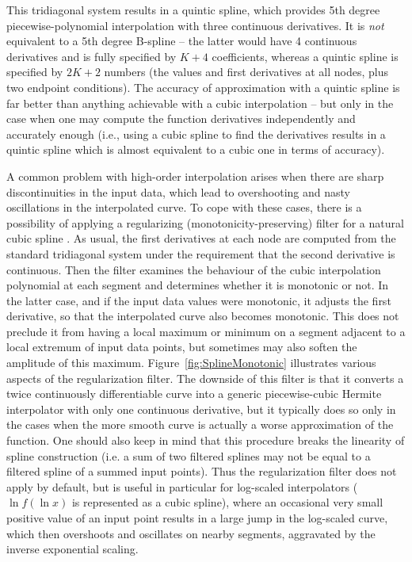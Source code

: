 \documentclass[12pt]{article}
\begin{document}
This tridiagonal system results in a quintic spline, which provides 5th degree piecewise-polynomial interpolation with three continuous derivatives. It is \textit{not} equivalent to a 5th degree B-spline -- the latter would have 4 continuous derivatives and is fully specified by $K+4$ coefficients, whereas a quintic spline is specified by $2K+2$ numbers (the values and first derivatives at all nodes, plus two endpoint conditions). The accuracy of approximation with a quintic spline is far better than anything achievable with a cubic interpolation -- but only in the case when one may compute the function derivatives independently and accurately enough (i.e., using a cubic spline to find the derivatives results in a quintic spline which is almost equivalent to a cubic one in terms of accuracy).

A common problem with high-order interpolation arises when there are sharp discontinuities in the input data, which lead to overshooting and nasty oscillations in the interpolated curve. To cope with these cases, there is a possibility of applying a regularizing (monotonicity-preserving) filter for a natural cubic spline \cite{Hyman}. As usual, the first derivatives at each node are computed from the standard tridiagonal system under the requirement that the second derivative is continuous. Then the filter examines the behaviour of the cubic interpolation polynomial at each segment and determines whether it is monotonic or not. In the latter case, and if the input data values were monotonic, it adjusts the first derivative, so that the interpolated curve also becomes monotonic. This does not preclude it from having a local maximum or minimum on a segment adjacent to a local extremum of input data points, but sometimes may also soften the amplitude of this maximum. Figure~\ref{fig:SplineMonotonic} illustrates various aspects of the regularization filter. The downside of this filter is that it converts a twice continuously differentiable curve into a generic piecewise-cubic Hermite interpolator with only one continuous derivative, but it typically does so only in the cases when the more smooth curve is actually a worse approximation of the function. One should also keep in mind that this procedure breaks the linearity of spline construction (i.e. a sum of two filtered splines may not be equal to a filtered spline of a summed input points). Thus the regularization filter does not apply by default, but is useful in particular for log-scaled interpolators ($\ln f(\ln x)$ is represented as a cubic spline), where an occasional very small positive value of an input point results in a large jump in the log-scaled curve, which then overshoots and oscillates on nearby segments, aggravated by the inverse exponential scaling.
\end{document}
